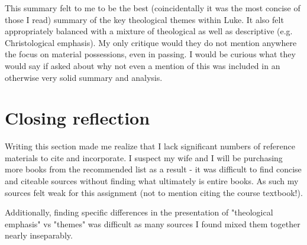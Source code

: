 \documentclass[12pt]{turabian-researchpaper}
\begin{document}
This summary felt to me to be the best (coincidentally it was the most concise of those I read) summary of the key theological themes within Luke. It also felt appropriately balanced with a mixture of theological as well as descriptive (e.g. Christological emphasis). My only critique would they do not mention anywhere the focus on material possessions, even in passing. I would be curious what they would say if asked about why not even a mention of this was included in an otherwise very solid summary and analysis.

\section{Closing reflection}

Writing this section made me realize that I lack significant numbers of reference materials to cite and incorporate. I suspect my wife and I will be purchasing more books from the recommended list as a result - it was difficult to find concise and citeable sources without finding what ultimately is entire books. As such my sources felt weak for this assignment (not to mention citing the course textbook!).

Additionally, finding specific differences in the presentation of "theological emphasis" vs "themes" was difficult as many sources I found mixed them together nearly inseparably. 

\newpage
\printbibliography
\end{document}
